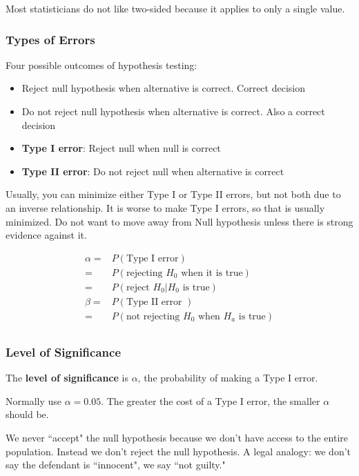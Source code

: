 \documentclass[11pt, oneside]{article}   	%
\begin{document}
Most statisticians do not like two-sided because it applies to only a single value. 

\subsubsection{Types of Errors}

Four possible outcomes of hypothesis testing:
\begin{itemize}
\item{Reject null hypothesis when alternative is correct. Correct decision}
\item{Do not reject null hypothesis when alternative is correct. Also a correct decision}
\item{\textbf{Type I error}: Reject null when null is correct}
\item{\textbf{Type II error}: Do not reject null when alternative is correct}
\end{itemize}

Usually, you can minimize either Type I or Type II errors, but not both due to an inverse relationship. It is worse to make Type I errors, so that is usually minimized. Do not want to move away from Null hypothesis unless there is strong evidence against it.

\begin{align*}
\alpha =& P(\text{Type I error}) \\
	   =& P(\text{rejecting } H_0 \text{ when it is true}) \\
	   =& P(\text{reject } H_0 | H_0 \text{ is true}) \\
\beta =& P(\text{Type II error }) \\
	   =& P(\text{not rejecting } H_0 \text{ when } H_a \text{ is true}) \\
\end{align*}

\subsubsection{Level of Significance}

The \textbf{level of significance} is $\alpha$, the probability of making a Type I error.

Normally use $\alpha = 0.05$. The greater the cost of a Type I error, the smaller $\alpha$ should be.

We never ``accept" the null hypothesis because we don't have access to the entire population. Instead we don't reject the null hypothesis. A legal analogy: we don't say the defendant is ``innocent", we say ``not guilty."
\end{document}
